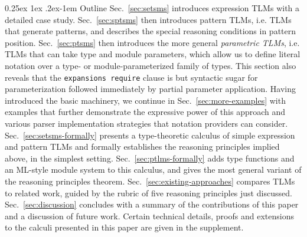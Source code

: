 \documentclass[acmsmall,review,anonymous]{acmart}\settopmatter{printfolios=true,printccs=false,printacmref=false}
\makeatletter
\renewcommand{\paragraph}{%
  \@startsection{paragraph}{4}%
  {\z@}{0.25ex \@plus 1ex \@minus .2ex}{-1em}%
  {\normalfont\normalsize\bfseries}%
}
\newcommand{\li}[1]{\lstinline[basicstyle=\ttfamily\fontsize{9pt}{1em}\selectfont]{#1}}
\makeatother
\begin{document}
\paragraph{Outline} 
Sec.~\ref{sec:setsms} introduces expression TLMs with a detailed case study. 
Sec.~\ref{sec:sptsms} then introduces {pattern TLMs}, i.e. TLMs that generate patterns, and describes the special reasoning conditions in pattern position. %
Sec.~\ref{sec:ptsms} then introduces the more general \emph{parametric TLMs}, i.e. TLMs that can take type and module parameters, which allow us to define literal notation over a type- or module-parameterized family of types. This section also reveals that the \li{expansions require} clause is but syntactic sugar for parameterization followed immediately by partial parameter application. 
Having introduced the basic machinery, we continue in Sec.~\ref{sec:more-examples} with examples that further demonstrate the expressive power of this approach and various parser implementation strategies that notation providers can consider. 
Sec.~\ref{sec:setsms-formally} presents a type-theoretic calculus of simple expression and pattern TLMs and formally establishes the reasoning principles implied above, in the simplest setting. 
Sec.~\ref{sec:ptlms-formally} adds type functions and an ML-style module system to this calculus, and gives the most general variant of the reasoning principles theorem. 
Sec.~\ref{sec:existing-approaches} compares TLMs to related work, guided by the rubric of five reasoning principles just discussed. 
Sec.~\ref{sec:discussion} concludes with a summary of the contributions of this paper and a discussion of future work.
Certain technical details, proofs and extensions to the calculi presented in this paper are given in the supplement. %
\end{document}
